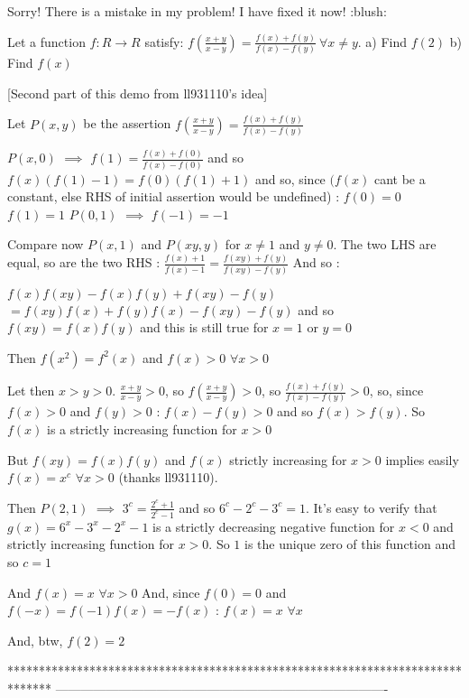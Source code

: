 \begin{solution}
	Sorry! There is a mistake in my problem! I have fixed it now!  :blush:
\end{solution}



\begin{solution}
	\begin{tcolorbox}Let a function $ f: R \rightarrow R$ satisfy: ${ f(\frac {x + y}{x - y}) = \frac {f(x) + f(y)}{f(x) - f( y)}\ \forall x\neq y}$.
a) Find $ f(2)$
b) Find $ f(x)$\end{tcolorbox}

[Second part of this demo from ll931110's idea]

Let $ P(x,y)$ be the assertion $ f(\frac {x + y}{x - y}) = \frac {f(x) + f(y)}{f(x) - f(y)}$

$ P(x,0)$ $ \implies$ $ f(1) = \frac {f(x) + f(0)}{f(x) - f(0)}$ and so $ f(x)(f(1) - 1) = f(0)(f(1) + 1)$ and so, since $ (f(x)$ cant be a constant, else RHS of initial assertion would be undefined) :
$ f(0) = 0$
$ f(1) = 1$
$ P(0,1)$ $ \implies$ $ f( - 1) = - 1$

Compare now $ P(x,1)$ and $ P(xy,y)$ for $ x\neq 1$ and $ y\neq 0$. The two LHS are equal, so are the two RHS : $ \frac {f(x) + 1}{f(x) - 1} = \frac {f(xy) + f(y)}{f(xy) - f(y)}$ And so :

$ f(x)f(xy) - f(x)f(y) + f(xy) - f(y)$ $ = f(xy)f(x) + f(y)f(x) - f(xy) - f(y)$ and so $ \boxed{f(xy) = f(x)f(y)}$  and this is still true for $ x = 1$ or $ y = 0$

Then $ f(x^2) = f^2(x)$ and $ f(x) > 0$ $ \forall x > 0$

Let then $ x > y > 0$. $ \frac {x + y}{x - y} > 0$, so $ f(\frac {x + y}{x - y}) > 0$, so $ \frac {f(x) + f(y)}{f(x) - f(y)} > 0$, so, since $ f(x) > 0$ and $ f(y) > 0$ : $ f(x) - f(y) > 0$ and so $ f(x) > f(y)$. So $ f(x)$ is a strictly increasing function for $ x > 0$

But $ f(xy) = f(x)f(y)$ and $ f(x)$ strictly increasing for $ x > 0$ implies easily $ f(x) = x^c$ $ \forall x > 0$ (thanks ll931110).

Then $ P(2,1)$ $ \implies$ $ 3^c = \frac {2^c + 1}{2^c - 1}$ and so $ 6^c - 2^c - 3^c = 1$. It's easy to verify that $ g(x) = 6^x - 3^x - 2^x - 1$ is a strictly decreasing negative function for $ x < 0$ and strictly increasing function for $ x > 0$. So $ 1$ is the unique zero of this function and so $ c = 1$

And $ f(x) = x$ $ \forall x > 0$
And, since $ f(0) = 0$ and $ f( - x) = f( - 1)f(x) = - f(x)$ : $ f(x) = x$ $ \forall x$

And, btw, $ f(2) = 2$
\end{solution}
*******************************************************************************
-------------------------------------------------------------------------------

